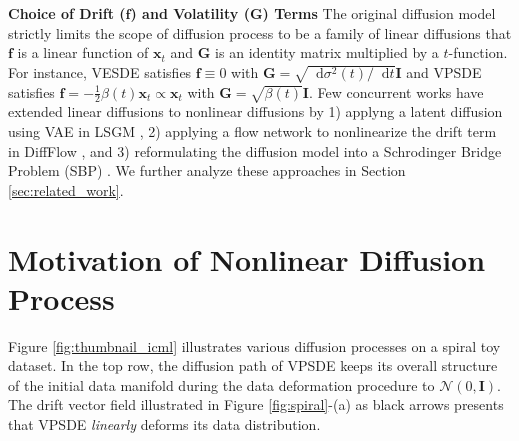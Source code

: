 \documentclass{article}
\theoremstyle{definition}
\theoremstyle{remark}
\newcommand*\diff{\mathop{}\!\mathrm{d}}
\begin{document}
	\textbf{Choice of Drift ($\mathbf{f}$) and Volatility ($\mathbf{G}$) Terms} The original diffusion model strictly limits the scope of diffusion process to be a family of linear diffusions that $\mathbf{f}$ is a linear function of $\mathbf{x}_{t}$ and $\mathbf{G}$ is an identity matrix multiplied by a $t$-function. For instance, VESDE \citep{song2020score, song2020improved} satisfies $\mathbf{f}\equiv 0$ with $\mathbf{G}=\sqrt{\diff\sigma^{2}(t)/\diff t}\mathbf{I}$ and VPSDE \citep{song2020score, ho2020denoising} satisfies $\mathbf{f}=-\frac{1}{2}\beta(t)\mathbf{x}_{t}\propto\mathbf{x}_{t}$ with $\mathbf{G}=\sqrt{\beta(t)}\mathbf{I}$. Few concurrent works have extended linear diffusions to nonlinear diffusions by 1) applyng a latent diffusion using VAE in LSGM \cite{vahdat2021score}, 2) applying a flow network to nonlinearize the drift term in DiffFlow \cite{zhang2021diffusion}, and 3) reformulating the diffusion model into a Schrodinger Bridge Problem (SBP) \cite{vargas2021solving,de2021diffusion,chen2021likelihood}. We further analyze these approaches in Section \ref{sec:related_work}. 
	
	\section{Motivation of Nonlinear Diffusion Process}\label{sec:motivation}
	
	Figure \ref{fig:thumbnail_icml} illustrates various diffusion processes on a spiral toy dataset. In the top row, the diffusion path of VPSDE keeps its overall structure of the initial data manifold during the data deformation procedure to $\mathcal{N}(0,\mathbf{I})$. The drift vector field illustrated in Figure \ref{fig:spiral}-(a) as black arrows presents that VPSDE \textit{linearly} deforms its data distribution.
	
	
	
\end{document}
